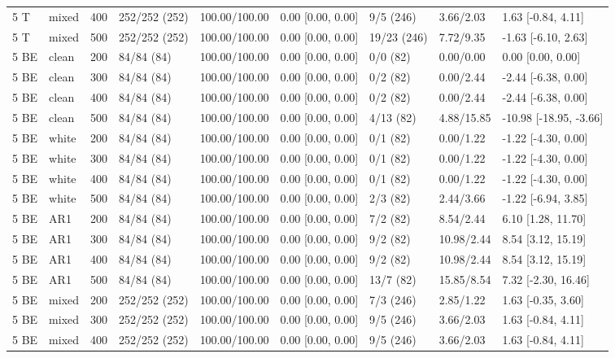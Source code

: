 \documentclass[10pt]{article}
\begin{document}
\begin{longtable}{@{}lllllllll@{}}
5 T & mixed & 400 & 252/252 (252) & 100.00/100.00 & 0.00 [0.00, 0.00] & 9/5 (246) & 3.66/2.03 & 1.63 [-0.84, 4.11] \\
5 T & mixed & 500 & 252/252 (252) & 100.00/100.00 & 0.00 [0.00, 0.00] & 19/23 (246) & 7.72/9.35 & -1.63 [-6.10, 2.63] \\
5 BE & clean & 200 & 84/84 (84) & 100.00/100.00 & 0.00 [0.00, 0.00] & 0/0 (82) & 0.00/0.00 & 0.00 [0.00, 0.00] \\
5 BE & clean & 300 & 84/84 (84) & 100.00/100.00 & 0.00 [0.00, 0.00] & 0/2 (82) & 0.00/2.44 & -2.44 [-6.38, 0.00] \\
5 BE & clean & 400 & 84/84 (84) & 100.00/100.00 & 0.00 [0.00, 0.00] & 0/2 (82) & 0.00/2.44 & -2.44 [-6.38, 0.00] \\
5 BE & clean & 500 & 84/84 (84) & 100.00/100.00 & 0.00 [0.00, 0.00] & 4/13 (82) & 4.88/15.85 & -10.98 [-18.95, -3.66] \\
5 BE & white & 200 & 84/84 (84) & 100.00/100.00 & 0.00 [0.00, 0.00] & 0/1 (82) & 0.00/1.22 & -1.22 [-4.30, 0.00] \\
5 BE & white & 300 & 84/84 (84) & 100.00/100.00 & 0.00 [0.00, 0.00] & 0/1 (82) & 0.00/1.22 & -1.22 [-4.30, 0.00] \\
5 BE & white & 400 & 84/84 (84) & 100.00/100.00 & 0.00 [0.00, 0.00] & 0/1 (82) & 0.00/1.22 & -1.22 [-4.30, 0.00] \\
5 BE & white & 500 & 84/84 (84) & 100.00/100.00 & 0.00 [0.00, 0.00] & 2/3 (82) & 2.44/3.66 & -1.22 [-6.94, 3.85] \\
5 BE & AR1 & 200 & 84/84 (84) & 100.00/100.00 & 0.00 [0.00, 0.00] & 7/2 (82) & 8.54/2.44 & 6.10 [1.28, 11.70] \\
5 BE & AR1 & 300 & 84/84 (84) & 100.00/100.00 & 0.00 [0.00, 0.00] & 9/2 (82) & 10.98/2.44 & 8.54 [3.12, 15.19] \\
5 BE & AR1 & 400 & 84/84 (84) & 100.00/100.00 & 0.00 [0.00, 0.00] & 9/2 (82) & 10.98/2.44 & 8.54 [3.12, 15.19] \\
5 BE & AR1 & 500 & 84/84 (84) & 100.00/100.00 & 0.00 [0.00, 0.00] & 13/7 (82) & 15.85/8.54 & 7.32 [-2.30, 16.46] \\
5 BE & mixed & 200 & 252/252 (252) & 100.00/100.00 & 0.00 [0.00, 0.00] & 7/3 (246) & 2.85/1.22 & 1.63 [-0.35, 3.60] \\
5 BE & mixed & 300 & 252/252 (252) & 100.00/100.00 & 0.00 [0.00, 0.00] & 9/5 (246) & 3.66/2.03 & 1.63 [-0.84, 4.11] \\
5 BE & mixed & 400 & 252/252 (252) & 100.00/100.00 & 0.00 [0.00, 0.00] & 9/5 (246) & 3.66/2.03 & 1.63 [-0.84, 4.11] \\

\end{longtable}
\end{document}
